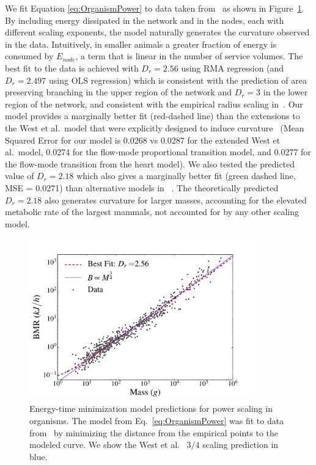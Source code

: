 \documentclass[12pt]{article}
\begin{document}
We fit Equation \ref{eq:OrganismPower} to data taken from~\cite{kolokotrones2010curvature} as shown
in Figure~\ref{fig:OrganismsPowerScaling}. By including energy dissipated in
the network and in the nodes, each with different scaling exponents, the model
naturally generates the curvature observed in the data.  Intuitively, in
smaller animals a greater fraction of energy is consumed by $E_{node}$, a term
that is linear in the number of service volumes. The best fit to
the data is achieved with $D_r = 2.56$ using RMA regression (and $D_r = 2.497$ using OLS regression) which is consistent with the prediction
of area preserving branching in the upper region of the network and $D_r = 3$
in the lower region of the network, and consistent with the empirical radius
scaling in~\cite{newberry2015testing}.  Our model provides a marginally better
fit (red-dashed line) than the extensions to the West et al.\ model that were explicitly designed
to induce curvature~\cite{kolokotrones2010curvature} (Mean Squared Error for
our model is 0.0268 vs 0.0287 for the extended West et al.\ model, 0.0274 for
the flow-mode proportional transition model, and 0.0277 for the flow-mode
transition from the heart model).  We also tested the predicted value of $D_r = 2.18$ which also gives a marginally better fit (green dashed line, MSE = 0.0271) than alternative models in ~\cite{kolokotrones2010curvature}. The theoretically predicted $D_r = 2.18$ also generates curvature for larger masses, accounting for the elevated metabolic rate of the largest mammals, not accounted for by any other scaling model.
 
\begin{figure}[!h] \centering
  \includegraphics[height=70mm]{Figures/OrganismsPowerScaling.pdf}

  \caption{Energy-time minimization model predictions for power
    scaling in organisms. The model from Eq.~\ref{eq:OrganismPower}
    was fit to data from~\cite{kolokotrones2010curvature} by minimizing the distance
    from the empirical points to the modeled curve. We show the West et al.~\cite{west97} $3/4$ scaling prediction in blue.
    }
\label{fig:OrganismsPowerScaling}
\end{figure}
\end{document}

